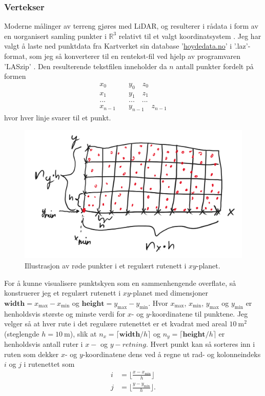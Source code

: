 \documentclass[norsk, doc, 11pt, a4paper]{apa7}  %
\newcommand{\R}{\mathbb{R}}
\begin{document}
\subsubsection{Vertekser} \label{M:1:1}
Moderne målinger av terreng gjøres med LiDAR, og resulterer i rådata i form av en uorganisert samling punkter i \(\R^{3}\) relativt til et valgt koordinatsystem \parencite{bergerSurveySurfaceReconstruction2017}. Jeg har valgt å laste ned punktdata fra Kartverket sin database '\url{hoydedata.no}' i '.laz'-format, som jeg så konverterer til en rentekst-fil ved hjelp av programvaren 'LASzip' \parencite{isenburgLASzip2019}. Den resulterende tekstfilen inneholder da \(n\) antall punkter fordelt på formen
\begin{align*}
 x_{0} \quad &y_{0} \quad z_{0} \\
 x_{1} \quad &y_{1} \quad z_{1} \\
 ... \quad &... \quad ... \\
 x_{n-1} \quad &y_{n-1} \quad z_{n-1}
\end{align*}
hvor hver linje svarer til et punkt.
\begin{figure}[H]
	\centering
	\includegraphics[width = .4\textwidth]{figs/PointGrid.png}
	\caption{Illustrasjon av røde punkter i et regulært rutenett i \(xy\)-planet.}
\end{figure}
For å kunne visualisere punktskyen som en sammenhengende overflate, så konstruerer jeg et regulært rutenett i \(xy\)-planet med dimensjoner \(\textbf{width} = x_{\text{max}} - x_{\text{min}}\) og \(\textbf{height} = y_{\text{max}} - y_{\text{min}}\). Hvor \(x_{\text{max}}\), \(x_{\text{min}}\), \(y_{\text{max}}\) og \(y_{\text{min}}\) er henholdsvis største og minste verdi for \(x\)- og \(y\)-koordinatene til punktene. Jeg velger så at hver rute i det regulære rutenettet er et kvadrat med areal \(\SI{10}{\metre\squared}\) (steglengde \(h = \SI{10}{\metre}\)), slik at \(n_{x} = \lceil \textbf{width}/h \rceil\) og \(n_{y} = \lceil \textbf{height}/h \rceil\) er henholdsvis antall ruter i \(x-\) og \(y-retning\). Hvert punkt kan så sorteres inn i ruten som dekker \(x\)- og \(y\)-koordinatene dens ved å regne ut rad- og kolonneindeks \(i\) og \(j\) i rutenettet som
\begin{align*}
	i &= \lfloor \frac{x - x_{\text{min}}}{h} \rfloor \\
	j &= \lfloor \frac{y - y_{\text{min}}}{h} \rfloor.
\end{align*}
\end{document}
